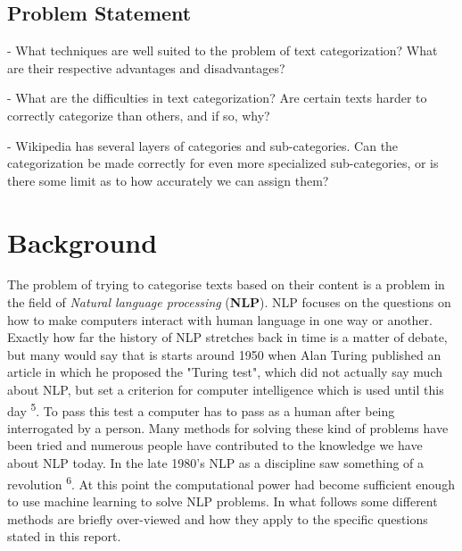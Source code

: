 \documentclass[a4paper]{article}
\begin{document}
\vspace{3mm}

\subsection{Problem Statement}

\vspace{3mm}

- What techniques are well suited to the problem of text categorization? What are their respective advantages and disadvantages?

\vspace{3mm}

- What are the difficulties in text categorization? Are certain texts harder to correctly categorize than others, and if so, why?

\vspace{3mm}

- Wikipedia has several layers of categories and sub-categories. Can the categorization be made correctly for even more specialized sub-categories, or is there some limit as to how accurately we can assign them?


\vspace{3mm}


\section{Background}

\vspace{3mm}

The problem of trying to categorise texts based on their content is a problem in the field of \textit{Natural language processing} (\textbf{NLP}). NLP focuses on the questions on how to make computers interact with human language in one way or another.\\

Exactly how far the history of NLP stretches back in time is a matter of debate, but many would say that is starts around 1950 when Alan Turing published an article in which he proposed the "Turing test", which did not actually say much about NLP, but set a criterion for computer intelligence which is used until this day \textsuperscript{5}. To pass this test a computer has to pass as a human after being interrogated by a person. Many methods for solving these kind of problems have been tried and numerous people have contributed to the knowledge we have about NLP today. In the late 1980's NLP as a discipline saw something of a revolution \textsuperscript{6}. At this point the computational power had become sufficient enough to use machine learning to solve NLP problems. In what follows some different methods are briefly over-viewed and how they apply to the specific questions stated in this report.\\
\end{document}
